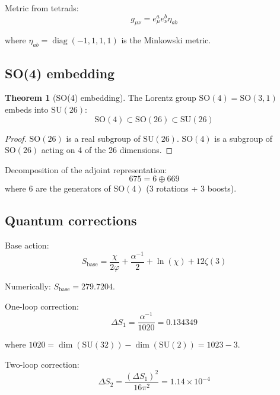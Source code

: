 \documentclass[12pt,a4paper,twoside]{article}
\newcommand{\SU}{\mathrm{SU}}
\newcommand{\SO}{\mathrm{SO}}
\newcommand{\diag}{\operatorname{diag}}
\theoremstyle{definition}
\newtheorem{theorem}{Theorem}[section]
\begin{document}
Metric from tetrads:
\begin{equation}
g_{\mu\nu} = e_\mu^a e_\nu^b \eta_{ab}
\label{eq:metric}
\end{equation}

where $\eta_{ab} = \diag(-1, 1, 1, 1)$ is the Minkowski metric.

\subsection{SO(4) embedding}

\begin{theorem}[SO(4) embedding]
The Lorentz group $\SO(4) = \SO(3,1)$ embeds into $\SU(26)$:
\begin{equation}
\SO(4) \subset \SO(26) \subset \SU(26)
\end{equation}
\end{theorem}

\begin{proof}
$\SO(26)$ is a real subgroup of $\SU(26)$. $\SO(4)$ is a subgroup of $\SO(26)$ acting on 4 of the 26 dimensions.
\end{proof}

Decomposition of the adjoint representation:
\begin{equation}
675 = 6 \oplus 669
\end{equation}
where 6 are the generators of $\SO(4)$ (3 rotations + 3 boosts).

\subsection{Quantum corrections}

Base action:
\begin{equation}
S_{\text{base}} = \frac{\chi}{2\varphi} + \frac{\alpha^{-1}}{2} + \ln(\chi) + 12\zeta(3)
\label{eq:s_base}
\end{equation}

Numerically: $S_{\text{base}} = 279.7204$.

One-loop correction:
\begin{equation}
\Delta S_1 = \frac{\alpha^{-1}}{1020} = 0.134349
\label{eq:ds1}
\end{equation}

where $1020 = \dim(\SU(32)) - \dim(\SU(2)) = 1023 - 3$.

Two-loop correction:
\begin{equation}
\Delta S_2 = \frac{(\Delta S_1)^2}{16\pi^2} = 1.14 \times 10^{-4}
\label{eq:ds2}
\end{equation}
\end{document}
